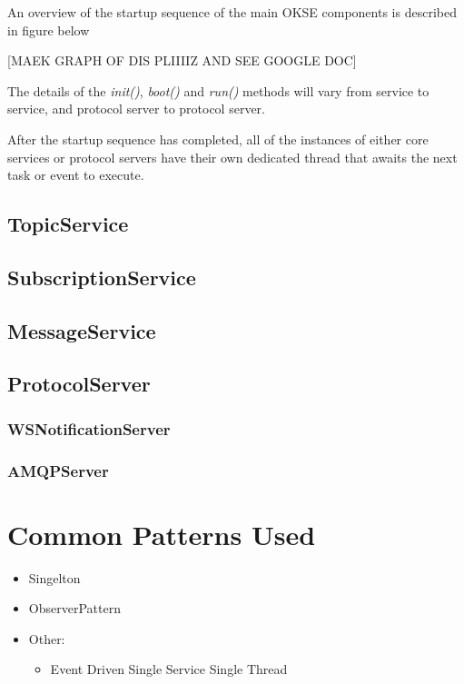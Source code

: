 An overview of the startup sequence of the main OKSE components is described in figure below

[MAEK GRAPH OF DIS PLIIIIZ AND SEE GOOGLE DOC]

The details of the \textit{init()}, \textit{boot()} and \textit{run()} methods will vary from service to service, and protocol server to protocol server.

After the startup sequence has completed, all of the instances of either core services or protocol servers have their own dedicated thread that awaits the next task or event to execute.

\subsection{TopicService}

\subsection{SubscriptionService}

\subsection{MessageService}

\subsection{ProtocolServer}
 
\subsubsection{WSNotificationServer}

\subsubsection{AMQPServer}

\section{Common Patterns Used}

\begin{itemize}
\item Singelton
\item ObserverPattern
\item Other: \begin{itemize}
\item Event Driven Single Service Single Thread
\end{itemize}
\end{itemize}


